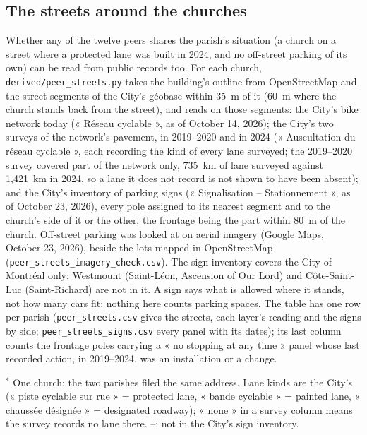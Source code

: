 \documentclass[11pt,letterpaper]{article}
\begin{document}
\subsection{The streets around the churches}\label{sec:streets}

Whether any of the twelve peers shares the parish's situation (a church on a street where a protected lane was built in 2024, and no off-street parking of its own) can be read from public records too. For each church, \texttt{derived/peer\_streets.py} takes the building's outline from OpenStreetMap and the street segments of the City's géobase within 35~m of it (60~m where the church stands back from the street), and reads on those segments: the City's bike network today (« Réseau cyclable », as of October 14, 2026); the City's two surveys of the network's pavement, in 2019--2020 and in 2024 (« Auscultation du réseau cyclable », each recording the kind of every lane surveyed; the 2019--2020 survey covered part of the network only, 735~km of lane surveyed against 1,421~km in 2024, so a lane it does not record is not shown to have been absent); and the City's inventory of parking signs (« Signalisation -- Stationnement », as of October 23, 2026), every pole assigned to its nearest segment and to the church's side of it or the other, the frontage being the part within 80~m of the church. Off-street parking was looked at on aerial imagery (Google Maps, October 23, 2026), beside the lots mapped in OpenStreetMap (\texttt{peer\_streets\_imagery\_check.csv}). The sign inventory covers the City of Montréal only: Westmount (Saint-Léon, Ascension of Our Lord) and Côte-Saint-Luc (Saint-Richard) are not in it. A sign says what is allowed where it stands, not how many cars fit; nothing here counts parking spaces. The table has one row per parish (\texttt{peer\_streets.csv} gives the streets, each layer's reading and the signs by side; \texttt{peer\_streets\_signs.csv} every panel with its dates); its last column counts the frontage poles carrying a « no stopping at any time » panel whose last recorded action, in 2019--2024, was an installation or a change.

\begin{center}\small\resizebox{\textwidth}{!}{}\end{center}
{\footnotesize $^{*}$ One church: the two parishes filed the same address. Lane kinds are the City's (« piste cyclable sur rue » = protected lane, « bande cyclable » = painted lane, « chaussée désignée » = designated roadway); « none » in a survey column means the survey records no lane there. --: not in the City's sign inventory.\par}
\end{document}
